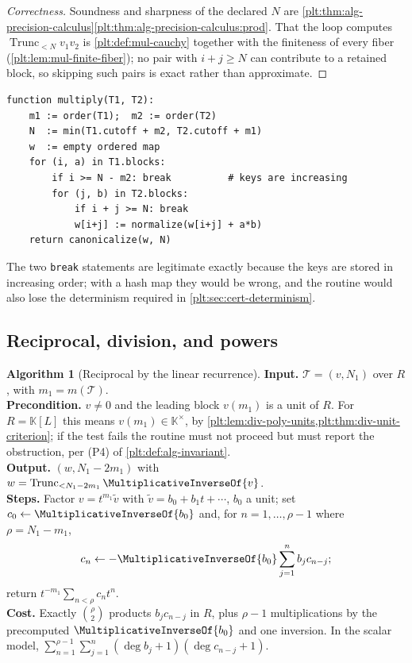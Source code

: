 \documentclass[11pt,oneside]{article}
\theoremstyle{plain}
\theoremstyle{definition}
\newtheorem{algorithm}[theorem]{Algorithm}
\theoremstyle{remark}
\newcommand{\K}{\mathbb{K}}
\newcommand{\Trunc}[2]{\operatorname{Trunc}_{<#2}#1}     %
\begin{document}
\begin{proof}[Correctness]
Soundness and sharpness of the declared \(N\) are
\cref{plt:thm:alg-precision-calculus}\ref{plt:thm:alg-precision-calculus:prod}.
That the loop computes \(\Trunc{v_1v_2}{N}\) is
\cref{plt:def:mul-cauchy} together with the finiteness of every fiber
(\cref{plt:lem:mul-finite-fiber}); no pair with \(i+j\ge N\) can contribute to
a retained block, so skipping such pairs is exact rather than approximate.
\end{proof}

\begin{lstlisting}[style=pseudo]
function multiply(T1, T2):
    m1 := order(T1);  m2 := order(T2)
    N  := min(T1.cutoff + m2, T2.cutoff + m1)
    w  := empty ordered map
    for (i, a) in T1.blocks:
        if i >= N - m2: break          # keys are increasing
        for (j, b) in T2.blocks:
            if i + j >= N: break
            w[i+j] := normalize(w[i+j] + a*b)
    return canonicalize(w, N)
\end{lstlisting}

The two \texttt{break} statements are legitimate exactly because the keys are
stored in increasing order; with a hash map they would be wrong, and the
routine would also lose the determinism required in
\cref{plt:sec:cert-determinism}.

\subsection{Reciprocal, division, and powers}
\label{plt:sec:alg-division}

\begin{algorithm}[Reciprocal by the linear recurrence]
\label{plt:alg:reciprocal-linear}
\textbf{Input.}  \(\mathcal T=(v,N_1)\) over \(R\), with \(m_1=m(\mathcal T)\).\\
\textbf{Precondition.}  \(v\ne0\) and the leading block \(v(m_1)\) is a unit of
\(R\).  For \(R=\K[L]\) this means \(v(m_1)\in\K^{\times}\), by
\cref{plt:lem:div-poly-units,plt:thm:div-unit-criterion}; if the test fails the
routine must not proceed but must report the obstruction, per (P4) of
\cref{plt:def:alg-invariant}.\\
\textbf{Output.}  \((w,N_1-2m_1)\) with \(w=\Trunc{\MultiplicativeInverseOf{v}}{N_1-2m_1}\).\\
\textbf{Steps.}  Factor \(v=t^{m_1}\widetilde v\) with
\(\widetilde v=b_0+b_1t+\cdots\), \(b_0\) a unit; set \(c_0\leftarrow
\MultiplicativeInverseOf{b_0}\) and, for \(n=1,\dots,\rho-1\) where
\(\rho=N_1-m_1\),
\[
 c_n\leftarrow-\MultiplicativeInverseOf{b_0}\sum_{j=1}^{n}b_jc_{n-j};
\]
return \(t^{-m_1}\sum_{n<\rho}c_nt^n\).\\
\textbf{Cost.}  Exactly \(\binom{\rho}{2}\) products \(b_jc_{n-j}\) in \(R\),
plus \(\rho-1\) multiplications by the precomputed
\(\MultiplicativeInverseOf{b_0}\) and one inversion.  In the scalar model,
\(\sum_{n=1}^{\rho-1}\sum_{j=1}^{n}(\deg b_j+1)(\deg c_{n-j}+1)\).
\end{algorithm}
\end{document}
